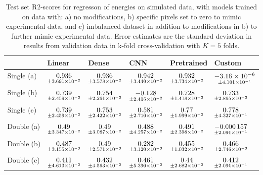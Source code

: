 \begin{table}
\centering
\caption{
Test set R2-scores for regresson of energies on simulated data, with models trained on data with: 
a) no modifications, b) specific pixels set to zero to mimic experimental data, and c) imbalanced dataset
in addition to modifications in b) to further mimic experimental data. Error estimates are the standard deviation 
in results from validation data in k-fold cross-validation with $K=5$ folds.
}
\label{tab:regression-simulated-all-energies-r2}
\begin{tabular}{llllll}
\toprule
{} &                                              Linear &                                               Dense &                                                  CNN &                                          Pretrained &                                                  Custom \\
\midrule
Single (a) &  $\underset{\num{+- 3.691e-02 }  }{\num{ 0.936 } }$ &  $\underset{\num{+- 3.578e-02 }  }{\num{ 0.936 } }$ &  $\underset{\num{+- 3.440e-02 }  }{\num{ 0.942 } }$ &  $\underset{\num{+- 3.734e-02 }  }{\num{ 0.932 } }$ &  $\underset{\num{+- 4.101e-01 }  }{\num{ -3.16e-06 } }$ \\
Single (b) &  $\underset{\num{+- 2.459e-02 }  }{\num{ 0.739 } }$ &  $\underset{\num{+- 2.261e-02 }  }{\num{ 0.754 } }$ &  $\underset{\num{+- 2.405e-02 }  }{\num{ -0.128 } }$ &  $\underset{\num{+- 1.418e-02 }  }{\num{ 0.728 } }$ &  $\underset{\num{+- 2.865e-02 }  }{\num{ 0.733 } }$ \\
Single (c) &  $\underset{\num{+- 2.459e-02 }  }{\num{ 0.739 } }$ &  $\underset{\num{+- 2.422e-02 }  }{\num{ 0.753 } }$ &  $\underset{\num{+- 2.710e-02 }  }{\num{ 0.581 } }$ &  $\underset{\num{+- 1.999e-02 }  }{\num{ 0.77 } }$ &  $\underset{\num{+- 4.327e-01 }  }{\num{ 0.778 } }$ \\
Double (a) &  $\underset{\num{+- 3.347e-02 }  }{\num{ 0.49 } }$ &  $\underset{\num{+- 3.087e-02 }  }{\num{ 0.49 } }$ &  $\underset{\num{+- 4.257e-02 }  }{\num{ 0.488 } }$ &  $\underset{\num{+- 2.398e-02 }  }{\num{ 0.491 } }$ &  $\underset{\num{+- 2.091e-01 }  }{\num{ -0.000157 } }$ \\
Double (b) &  $\underset{\num{+- 3.155e-03 }  }{\num{ 0.487 } }$ &  $\underset{\num{+- 2.571e-03 }  }{\num{ 0.49 } }$ &  $\underset{\num{+- 3.120e-03 }  }{\num{ 0.282 } }$ &  $\underset{\num{+- 1.032e-02 }  }{\num{ 0.455 } }$ &  $\underset{\num{+- 2.746e-03 }  }{\num{ 0.466 } }$ \\
Double (c) &  $\underset{\num{+- 4.613e-02 }  }{\num{ 0.411 } }$ &  $\underset{\num{+- 4.563e-02 }  }{\num{ 0.432 } }$ &  $\underset{\num{+- 5.390e-02 }  }{\num{ 0.461 } }$ &  $\underset{\num{+- 2.682e-02 }  }{\num{ 0.44 } }$ &  $\underset{\num{+- 2.091e-01 }  }{\num{ 0.412 } }$ \\
\bottomrule
\end{tabular}
\end{table}
